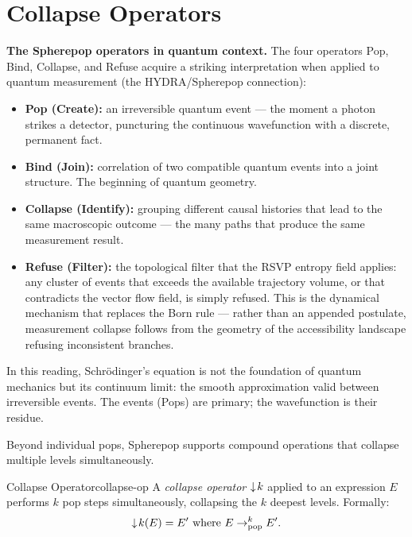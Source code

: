 \section{Collapse Operators}

\begin{remark}
  \textbf{The Spherepop operators in quantum context.} The four operators
  Pop, Bind, Collapse, and Refuse acquire a striking interpretation when
  applied to quantum measurement (the HYDRA/Spherepop connection):

  \begin{itemize}
    \item \textbf{Pop (Create):} an irreversible quantum event — the
          moment a photon strikes a detector, puncturing the continuous
          wavefunction with a discrete, permanent fact.
    \item \textbf{Bind (Join):} correlation of two compatible quantum
          events into a joint structure. The beginning of quantum geometry.
    \item \textbf{Collapse (Identify):} grouping different causal
          histories that lead to the same macroscopic outcome — the
          many paths that produce the same measurement result.
    \item \textbf{Refuse (Filter):} the topological filter that the RSVP
          entropy field applies: any cluster of events that exceeds
          the available trajectory volume, or that contradicts the
          vector flow field, is simply refused. This is the dynamical
          mechanism that replaces the Born rule — rather than an
          appended postulate, measurement collapse follows from the
          geometry of the accessibility landscape refusing inconsistent
          branches.
  \end{itemize}

  In this reading, Schrödinger's equation is not the foundation of
  quantum mechanics but its continuum limit: the smooth approximation
  valid between irreversible events. The events (Pops) are primary;
  the wavefunction is their residue.
\end{remark}


Beyond individual pops, Spherepop supports compound operations that
collapse multiple levels simultaneously.

\begin{definition}{Collapse Operator}{collapse-op}
  A \emph{collapse operator} $\downarrow\!k$ applied to an expression $E$
  performs $k$ pop steps simultaneously, collapsing the $k$ deepest
  levels. Formally:
  \[
    \downarrow\!k(E) = E' \text{ where } E \to_\text{pop}^k E'.
  \]
\end{definition}

